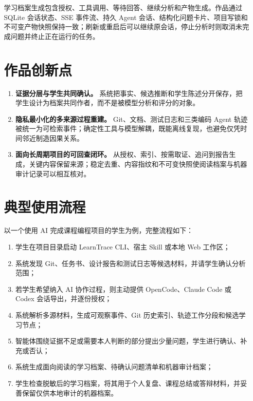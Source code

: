 \documentclass[UTF8,a4paper,12pt]{ctexart}
\begin{document}
学习档案生成包含授权、工具调用、等待回答、继续分析和产物生成。作品通过 SQLite 会话状态、SSE 事件流、持久 Agent 会话、结构化问题卡片、项目写锁和不可变产物快照保持一致；刷新或重启后可以继续原会话，停止分析时则取消未完成问题并终止正在运行的任务。

\section{作品创新点}

\begin{enumerate}
  \item \textbf{证据分层与学生共同确认。} 系统把事实、候选推断和学生陈述分开保存，把学生设计为档案共同作者，而不是被模型分析和评分的对象。
  \item \textbf{隐私最小化的多来源过程重建。} Git、文档、测试日志和三类编码 Agent 轨迹被统一为可检索事件；确定性工具与模型解耦，既能离线复现，也避免仅凭时间邻近制造因果关系。
  \item \textbf{面向长周期项目的可回查闭环。} 从授权、索引、按需取证、追问到报告生成，关键内容保留来源；稳定去重、内容指纹和不可变快照使阅读档案与机器审计记录可以相互核对。
\end{enumerate}

\section{典型使用流程}

以一个使用 AI 完成课程编程项目的学生为例，完整流程如下：

\begin{enumerate}
  \item 学生在项目目录启动 LearnTrace CLI、宿主 Skill 或本地 Web 工作区；
  \item 系统发现 Git、任务书、设计报告和测试日志等候选材料，并请学生确认分析范围；
  \item 若学生希望纳入 AI 协作过程，则主动提供 OpenCode、Claude Code 或 Codex 会话导出，并逐份授权；
  \item 系统解析多源材料，生成可观察事件、Git 历史索引、轨迹工作分段和候选学习节点；
  \item 智能体围绕证据不足或需要本人判断的部分提出少量问题，学生进行确认、补充或否认；
  \item 系统生成面向阅读的学习档案、待确认问题清单和机器审计档案；
  \item 学生检查脱敏后的学习档案，将其用于个人复盘、课程总结或答辩材料，并妥善保留仅供本地审计的机器档案。
\end{enumerate}
\end{document}
